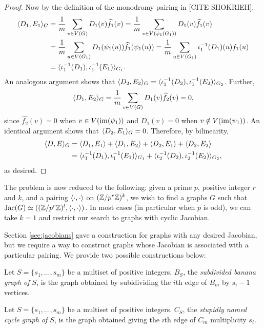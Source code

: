 \documentclass{amsart}
\begin{document}
\begin{proof}
  Now by the definition of the monodromy pairing in [CITE SHOKRIEH],
  \begin{align*}
    \langle D_1, E_1 \rangle_G &= \frac{1}{m} \sum_{v \in V(G)} D_1(v) \widehat{f_1}(v) = \frac{1}{m} \sum_{v \in V(\psi_1(G_1))} D_1(v) \widehat{f_1}(v) \\
    &= \frac{1}{m} \sum_{u \in V(G_1)} D_1(\psi_1(u)) \widehat{f_1}(\psi_1(u)) = \frac{1}{m} \sum_{u\in V(G_1)} \iota_1^{-1}(D_1)(u)f_1(u) \\
    &= \langle \iota_1^{-1}(D_1), \iota_1^{-1}(E_1) \rangle_{G_1}.
  \end{align*}
  An analogous argument shows that $\langle D_2, E_2 \rangle_G =
  \langle \iota_1^{-1}(D_2), \iota_1^{-1}(E_2) \rangle_{G_2}$. Further,
  \[
  \langle D_1, E_2 \rangle_G = \frac{1}{m} \sum_{v \in V(G)} D_1(v)
  \widehat{f_2}(v) = 0,
  \]
  since $\widehat{f_2}(v)=0$ when $v\in V(\operatorname{im}(\psi_1))$ and $D_1(v)=0$
  when $v\notin V(\operatorname{im}(\psi_1))$. An identical argument shows that
  $\langle D_2, E_1 \rangle_G = 0$. Therefore, by bilinearity,
  \begin{align*}
    \langle D, E \rangle_G &= \langle D_1, E_1 \rangle + \langle D_1, E_2 \rangle + \langle D_2, E_1 \rangle + \langle D_2, E_2 \rangle \\
    &= \langle \iota_1^{-1}(D_1), \iota_1^{-1}(E_1) \rangle_{G_1} + \langle \iota_2^{-1}(D_2), \iota_2^{-1}(E_2) \rangle_{G_2},
  \end{align*}
  as desired.
\end{proof}


The problem is now reduced to the following: given a prime $p$,
positive integer $r$ and $k$, and a pairing $\langle \cdot, \cdot \rangle$ on
$(\mathbb{Z}/p^r\mathbb{Z})^k$, we wish to find a graphs $G$ such that $\operatorname{Jac}(G) \simeq
((\mathbb{Z}/p^r\mathbb{Z})^l, \langle \cdot, \cdot \rangle)$. In most cases (in particular
when $p$ is odd), we can take $k=1$ and restrict our search to graphs
with cyclic Jacobian.

Section \ref{sec:jacobians} gave a construction for graphs with any
desired Jacobian, but we require a way to construct graphs whose
Jacobian is associated with a particular pairing. We provide two
possible constructions below:

\begin{defn}
  Let $S = \{s_1, \ldots, s_m\}$ be a multiset of positive
  integers. $B_S$, the \emph{subdivided banana graph of $S$}, is the
  graph obtained by subidividing the $i$th edge of $B_m$ by $s_i-1$
  vertices.
\end{defn}

\begin{defn}
  Let $S = \{s_1, \ldots, s_m\}$ be a multiset of positive
  integers. $C_S$, the \emph{stupidly named cycle graph of $S$}, is
  the graph obtained giving the $i$th edge of $C_m$ multiplicity
  $s_i$.
\end{defn}
\end{document}
